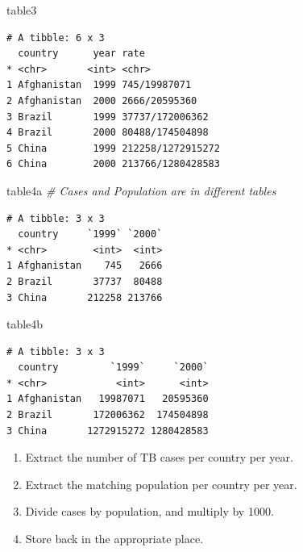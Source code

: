 \documentclass[
]{article}
\newenvironment{Shaded}{\begin{snugshade}}{\end{snugshade}}
\newcommand{\CommentTok}[1]{\textcolor[rgb]{0.56,0.35,0.01}{\textit{#1}}}
\newcommand{\NormalTok}[1]{#1}
\begin{document}
\begin{Shaded}
\begin{Highlighting}[]
\NormalTok{table3}
\end{Highlighting}
\end{Shaded}

\begin{verbatim}
# A tibble: 6 x 3
  country      year rate             
* <chr>       <int> <chr>            
1 Afghanistan  1999 745/19987071     
2 Afghanistan  2000 2666/20595360    
3 Brazil       1999 37737/172006362  
4 Brazil       2000 80488/174504898  
5 China        1999 212258/1272915272
6 China        2000 213766/1280428583
\end{verbatim}

\begin{Shaded}
\begin{Highlighting}[]
\NormalTok{table4a }\CommentTok{\# Cases and Population are in different tables}
\end{Highlighting}
\end{Shaded}

\begin{verbatim}
# A tibble: 3 x 3
  country     `1999` `2000`
* <chr>        <int>  <int>
1 Afghanistan    745   2666
2 Brazil       37737  80488
3 China       212258 213766
\end{verbatim}

\begin{Shaded}
\begin{Highlighting}[]
\NormalTok{table4b}
\end{Highlighting}
\end{Shaded}

\begin{verbatim}
# A tibble: 3 x 3
  country         `1999`     `2000`
* <chr>            <int>      <int>
1 Afghanistan   19987071   20595360
2 Brazil       172006362  174504898
3 China       1272915272 1280428583
\end{verbatim}

\begin{enumerate}
\def\labelenumi{\arabic{enumi}.}
\item
  Extract the number of TB cases per country per year.
\item
  Extract the matching population per country per year.
\item
  Divide cases by population, and multiply by 1000.
\item
  Store back in the appropriate place.
\end{enumerate}
\end{document}
